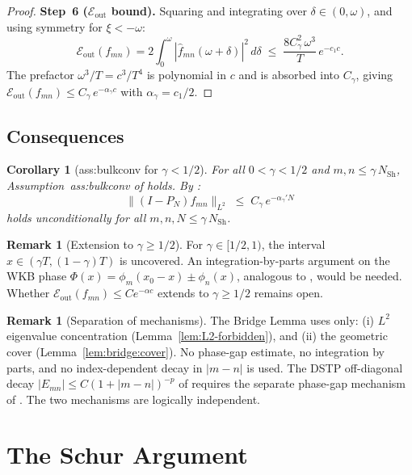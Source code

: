 \documentclass[12pt,a4paper]{article}
\newtheorem{corollary}[theorem]{Corollary}
\theoremstyle{definition}
\newtheorem{remark}[theorem]{Remark}
\newcommand{\NSh}{N_{\mathrm{Sh}}}
\newcommand{\Eout}{\mathcal{E}_{\mathrm{out}}}
\begin{document}
\begin{proof}
\textbf{Step~6 ($\Eout$ bound).}
Squaring and integrating over $\delta \in (0,\omega)$,
and using symmetry for $\xi < -\omega$:
\begin{equation}
\label{eq:bridge:Eout}
  \Eout(f_{mn})
  = 2\int_0^\omega
    |\widehat{f}_{mn}(\omega+\delta)|^2\,d\delta
  \;\le\;
  \frac{8C_\gamma^2\,\omega^3}{T}\,e^{-c_1 c}.
\end{equation}
The prefactor $\omega^3/T = c^3/T^4$ is polynomial in $c$
and is absorbed into $C_\gamma$, giving
$\Eout(f_{mn}) \le C_\gamma\,e^{-\alpha_\gamma c}$
with $\alpha_\gamma = c_1/2$.
\end{proof}

\subsection{Consequences}

\begin{corollary}[ass:bulkconv for $\gamma < 1/2$]
\label{cor:bulkconv}
For all $0 < \gamma < 1/2$ and $m,n \le \gamma\,\NSh$,
Assumption~ass:bulkconv of \cite{PaperIII} holds.
By \cite[Theorem~3.2]{PaperIII}:
\[
  \|(I-P_N)f_{mn}\|_{L^2}
  \;\le\; C_\gamma\,e^{-\alpha_\gamma' N}
\]
holds unconditionally for all $m,n,N \le \gamma\,\NSh$.
\end{corollary}

\begin{remark}[Extension to $\gamma \ge 1/2$]
\label{rem:bridge:extension}
For $\gamma \in [1/2,1)$, the interval
$x \in (\gamma T,(1-\gamma)T)$ is uncovered.
An integration-by-parts argument on the WKB phase
$\Phi(x) = \phi_m(x_0-x) \pm \phi_n(x)$, analogous
to \cite{PaperI}, would be needed.
Whether $\Eout(f_{mn}) \le Ce^{-\alpha c}$ extends to
$\gamma \ge 1/2$ remains open.
\end{remark}

\begin{remark}[Separation of mechanisms]
\label{rem:bridge:separation}
The Bridge Lemma uses only:
(i) $L^2$ eigenvalue concentration
(Lemma~\ref{lem:L2-forbidden}), and
(ii) the geometric cover (Lemma~\ref{lem:bridge:cover}).
No phase-gap estimate, no integration by parts, and
no index-dependent decay in $|m-n|$ is used.
The DSTP off-diagonal decay
$|E_{mn}| \le C(1+|m-n|)^{-p}$ of \cite{PaperI}
requires the separate phase-gap mechanism of \cite{PaperI}.
The two mechanisms are logically independent.
\end{remark}

\section{The Schur Argument}
\label{sec:schur}
\end{document}

